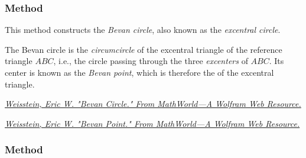 

\subsubsection{Method    } %
\label{ssub:methods_triangle_bevan_circle}

This method constructs the \emph{Bevan circle}, also known as the \emph{excentral circle}.

The Bevan circle is the \emph{circumcircle} of the excentral triangle of the reference triangle \( ABC \), i.e., the circle passing through the three \emph{excenters} of \( ABC \). Its center is known as the \emph{Bevan point}, which is therefore the  of the excentral triangle.



\begin{flushright}
\href{https://mathworld.wolfram.com/BevanCircle.html}
{\textit{Weisstein, Eric W. "Bevan Circle." From MathWorld—A Wolfram Web Resource.}}
\end{flushright}

\begin{flushright}
\href{https://mathworld.wolfram.com/BevanPoint.html}
{\textit{Weisstein, Eric W. "Bevan Point." From MathWorld—A Wolfram Web Resource.}}
\end{flushright}

\vspace{1em}
\begin{tkzexample}[latex=.5\textwidth]
\end{tkzexample}



\subsubsection{Method } %
\label{ssub:method_triangle_taylor__circle}

